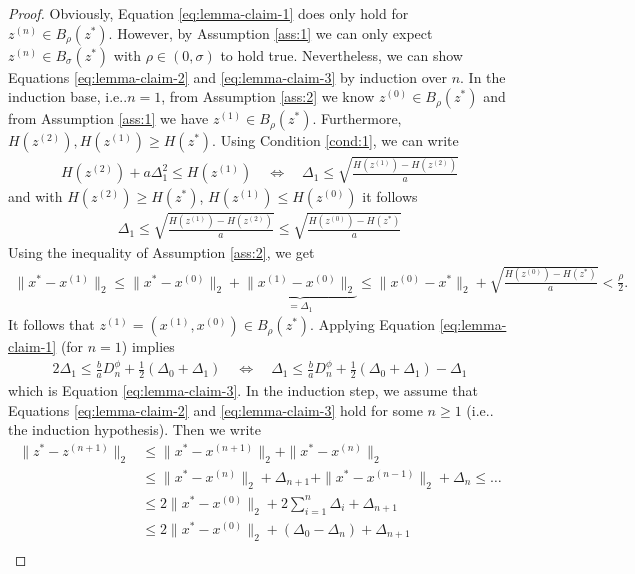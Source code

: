 \documentclass[onecolumn,final,a4paper,13pt,reqno]{siamart}
\makeatletter
\DeclareRobustCommand\onedot{\futurelet\@let@token\@onedot}
\def\@onedot{\ifx\@let@token.\else.\null\fi\xspace}
\def\ie{{i.e}\onedot} \def\Ie{{I.e}\onedot}
\makeatother
\begin{document}
\begin{proof}
	Obviously, Equation \eqref{eq:lemma-claim-1} does only hold for $z^{(n)} \in B_\rho(z^\ast)$. However, by Assumption \ref{ass:1} we can only expect $z^{(n)} \in B_\sigma(z^\ast)$ with $\rho \in (0, \sigma)$ to hold true. Nevertheless, we can show Equations \eqref{eq:lemma-claim-2} and \eqref{eq:lemma-claim-3} by induction over $n$. In the induction base, \ie $n = 1$, from Assumption \ref{ass:2} we know $z^{(0)} \in B_\rho(z^\ast)$ and from Assumption \ref{ass:1} we have $z^{(1)} \in B_\rho(z^\ast)$. Furthermore, $H(z^{(2)}), H(z^{(1)}) \geq H(z^\ast)$. Using Condition \ref{cond:1}, we can write
	\begin{align}
		H(z^{(2)}) + a\Delta_1^2 \leq H(z^{(1)})\quad\Leftrightarrow\quad \Delta_1 \leq \sqrt{\frac{H(z^{(1)}) - H(z^{(2)})}{a}}
	\end{align}
	and with $H(z^{(2)}) \geq H(z^\ast)$, $H(z^{(1)}) \leq H(z^{(0)})$ it follows
	\begin{align}
		\Delta_1 \leq \sqrt{\frac{H(z^{(1)}) - H(z^{(2)})}{a}} \leq \sqrt{\frac{H(z^{(0)}) - H(z^\ast)}{a}}\label{eq:lemma-ib}
	\end{align}
	Using the inequality of Assumption \ref{ass:2}, we get
	\begin{align}
		\|x^\ast - x^{(1)}\|_2 \leq \|x^\ast - x^{(0)}\|_2 + \underbrace{\|x^{(1)} - x^{(0)}\|_2}_{=\Delta_1} \leq \|x^{(0)} - x^\ast\|_2 + \sqrt{\frac{H(z^{(0)}) - H(z^\ast)}{a}} < \frac{\rho}{2}.
	\end{align}
	It follows that $z^{(1)} = (x^{(1)}, x^{(0)}) \in B_\rho(z^\ast)$. Applying Equation \eqref{eq:lemma-claim-1} (for $n = 1$) implies
	\begin{align}
		2\Delta_1 \leq \frac{b}{a} D_n^\phi + \frac{1}{2}(\Delta_0 + \Delta_1) \quad\Leftrightarrow\quad \Delta_1 \leq \frac{b}{a} D_n^\phi + \frac{1}{2}(\Delta_0 + \Delta_1) - \Delta_1
	\end{align}
	which is Equation \eqref{eq:lemma-claim-3}. In the induction step, we assume that Equations \eqref{eq:lemma-claim-2} and \eqref{eq:lemma-claim-3} hold for some $n \geq 1$ (\ie the induction hypothesis). Then we write
	\begin{align}
		\|z^\ast - z^{(n + 1)}\|_2 &\leq \|x^\ast - x^{(n + 1)}\|_2 + \|x^\ast - x^{(n)}\|_2\\
		&\leq \|x^\ast - x^{(n)}\|_2 + \Delta_{n + 1} + \|x^\ast - x^{(n - 1)}\|_2 + \Delta_n \leq \ldots\\
		&\leq 2\|x^\ast - x^{(0)}\|_2 + 2\sum_{i = 1}^n \Delta_i + \Delta_{n + 1}\\
		&\leq 2\|x^\ast - x^{(0)}\|_2 + (\Delta_0 - \Delta_n) + \Delta_{n + 1}\\

\end{align}
\end{proof}
\end{document}
